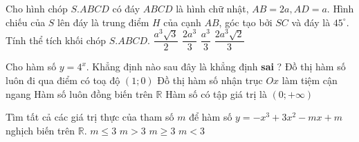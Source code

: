 \begin{ex}%
	Cho hình chóp $ S.ABCD $ có đáy $ ABCD $ là hình chữ nhật, $ AB = 2a, AD = a $. Hình chiếu của $ S $ lên đáy là trung điểm $ H $ của cạnh $ AB $, góc tạo bởi $ SC $ và đáy là $ 45^{\circ} $. Tính thể tích khối chóp $ S.ABCD $.
	\choice
	{$ \dfrac{a^3 \sqrt{3} }{2} $}
	{$ \dfrac{2 a^3}{3} $}
	{$ \dfrac{a^3}{3} $}
	{ \True $ \dfrac{2a^3 \sqrt{2}}{3} $}
\end{ex}
\begin{ex}%
	Cho hàm số $ y = 4^x $. Khẳng định nào sau đây là khẳng định \textbf{sai} ?
	\choice
	{ \True Đồ thị hàm số luôn đi qua điểm có toạ độ $ (1;0) $}
	{Đồ thị hàm số nhận trục $ Ox $ làm tiệm cận ngang}
	{Hàm số luôn đồng biến trên $ \mathbb{R} $}
	{Hàm số có tập giá trị là $ (0; + \infty) $}
\end{ex}
\begin{ex}%
	Tìm tất cả các giá trị thực của tham số $ m $ để hàm số $  y = - x^3 + 3x^2 - mx + m $ nghịch biến trên $ \mathbb{R} $.
	\choice
	{$ m \leq 3 $}
	{$ m > 3 $}
	{ \True $ m \geq 3 $}
	{$ m < 3 $}
\end{ex}
